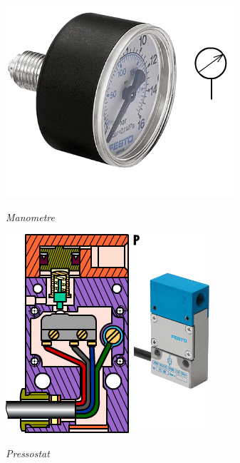 \documentclass[10pt]{article}
\begin{document}
\begin{minipage}[c]{.3\linewidth}
\begin{center}
\includegraphics[width=.8\textwidth]{images/Manometre}

\textit{Manometre}
\end{center}
\end{minipage}\hfill
\begin{minipage}[c]{.3\linewidth}
\begin{center}
\includegraphics[width=.8\textwidth]{images/Pressostat}

\textit{Pressostat}
\end{center}
\end{minipage}\hfill
\end{document}
